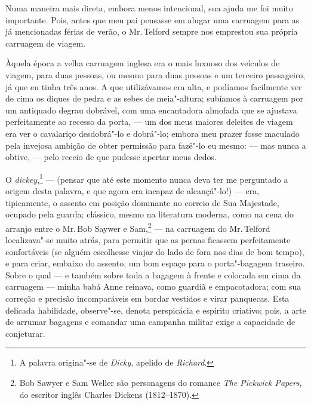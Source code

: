 Numa maneira mais direta, embora menos intencional, sua ajuda me foi
muito importante. Pois, antes que meu pai pensasse em alugar uma
carruagem para as já mencionadas férias de verão, o Mr.\,Telford sempre
nos emprestou sua própria carruagem de viagem.

Àquela época a velha carruagem inglesa era o mais luxuoso dos veículos
de viagem, para duas pessoas, ou mesmo para duas pessoas e um terceiro
passageiro, já que eu tinha três anos. A que utilizávamos era alta, e
podíamos facilmente ver de cima os diques de pedra e as sebes de
meia"-altura; subíamos à carruagem por um antiquado degrau dobrável, com
uma encantadora almofada que se ajustava perfeitamente ao recesso da
porta, --- um dos meus maiores deleites de viagem era ver o cavalariço
desdobrá"-lo e dobrá"-lo; embora meu prazer fosse maculado pela invejosa
ambição de obter permissão para fazê"-lo eu mesmo: --- mas nunca a obtive,
--- pelo receio de que pudesse apertar meus dedos.

O \textit{dickey},\footnote{A palavra origina"-se de \textit{Dicky}, 
  apelido de \textit{Richard}.} --- (pensar que até este \label{dickey}
momento nunca deva ter me perguntado a origem desta palavra, e que agora
era incapaz de alcançá"-lo!) --- era, tipicamente, o assento em posição
dominante no correio de Sua Majestade, ocupado pela guarda; clássico,
mesmo na literatura moderna, como na cena do arranjo entre o Mr.\,Bob
Saywer e Sam,\footnote{Bob Sawyer e Sam Weller são personagens do romance
  \textit{The Pickwick Papers}, do escritor inglês Charles Dickens
  (1812--1870).} --- na carruagem do Mr.\,Telford
localizava"-se muito atrás, para permitir que as pernas ficassem
perfeitamente confortáveis (se alguém escolhesse viajar do lado de fora
nos dias de bom tempo), e para criar, embaixo do assento, um bom espaço
para o porta"-bagagem traseiro. Sobre o qual --- e também sobre toda a
bagagem à frente e colocada em cima da carruagem --- minha babá Anne
reinava, como guardiã e empacotadora; com sua correção e precisão
incomparáveis em bordar vestidos e virar panquecas. Esta delicada
habilidade, observe"-se, denota perspicácia e espírito criativo; pois, a
arte de arrumar bagagens e comandar uma campanha militar exige a
capacidade de conjeturar.

